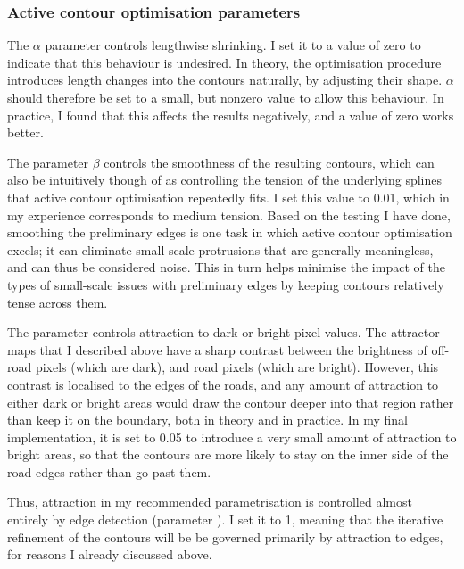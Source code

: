 \subsubsection{Active contour optimisation parameters}

The $\alpha$ parameter controls lengthwise shrinking. I set it to a value of zero to indicate that this behaviour is undesired. In theory, the optimisation procedure introduces length changes into the contours naturally, by adjusting their shape. $\alpha$ should therefore be set to a small, but nonzero value to allow this behaviour. In practice, I found that this affects the results negatively, and a value of zero works better.

The parameter $\beta$ controls the smoothness of the resulting contours, which can also be intuitively though of as controlling the tension of the underlying splines that active contour optimisation repeatedly fits. I set this value to 0.01, which in my experience corresponds to medium tension. Based on the testing I have done, smoothing the preliminary edges is one task in which active contour optimisation excels; it can eliminate small-scale protrusions that are generally meaningless, and can thus be considered noise. This in turn helps minimise the impact of the types of small-scale issues with preliminary edges by keeping contours relatively tense across them.

The parameter  controls attraction to dark or bright pixel values. The attractor maps that I described above have a sharp contrast between the brightness of off-road pixels (which are dark), and road pixels (which are bright). However, this contrast is localised to the edges of the roads, and any amount of attraction to either dark or bright areas would draw the contour deeper into that region rather than keep it on the boundary, both in theory and in practice. In my final implementation, it is set to 0.05 to introduce a very small amount of attraction to bright areas, so that the contours are more likely to stay on the inner side of the road edges rather than go past them.

Thus, attraction in my recommended parametrisation is controlled almost entirely by edge detection (parameter ). I set it to 1, meaning that the iterative refinement of the contours will be be governed primarily by attraction to edges, for reasons I already discussed above.

